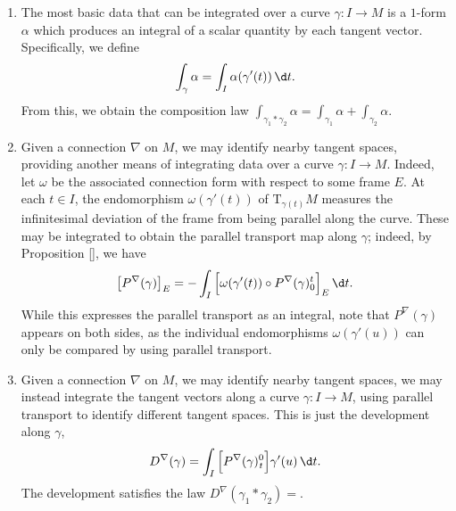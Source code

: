 \begin{enumerate}
  \item The most basic data that can be integrated over a curve $\gamma \colon I \to M$ is a $1$-form $\alpha$ which produces an integral of a scalar quantity by  each tangent vector. Specifically, we define
  \begin{equation}
    \int_{\gamma} \alpha = \int_{I} \alpha(\gamma'(t)) \, \d t.
  \end{equation}
  From this, we obtain the composition law $\int_{\gamma_1 \ast \gamma_2} \alpha = \int_{\gamma_1} \alpha + \int_{\gamma_2} \alpha$.

  \item Given a connection $\nabla$ on $M$, we may identify nearby tangent spaces, providing another means of integrating data over a curve $\gamma \colon I \to M $. Indeed, let $\omega$ be the associated connection form with respect to some frame $E$. At each $t \in I$, the endomorphism $\omega(\gamma'(t))$ of $\mathrm{T}_{\gamma(t)} M$ measures the infinitesimal deviation of the frame from being parallel along the curve. These may be integrated to obtain the parallel transport map along $\gamma$; indeed, by Proposition \ref{}, we have
  \begin{equation}
    \big[P^\nabla(\gamma)\big]_{E} = -\int_I \Big[\omega(\gamma'(t)) \circ P^\nabla(\gamma)_{0}^{t}\Big]_E \, \d t.
  \end{equation}
  While this expresses the parallel transport as an integral, note that $P^\nabla(\gamma)$ appears on both sides, as the individual endomorphisms $\omega(\gamma'(u))$ can only be compared by using parallel transport.

  \item Given a connection $\nabla$ on $M$, we may identify nearby tangent spaces, we may instead integrate the tangent vectors along a curve $\gamma \colon I \to M$, using parallel transport to identify different tangent spaces. This is just the development along $\gamma$, 
  \begin{equation}
    D^\nabla(\gamma) = \int_I \Big[ P^\nabla(\gamma)_{\mskip 1mu t}^{0} \Big]\gamma'(u) \, \d t.
  \end{equation}
  The development satisfies the  law $D^\nabla(\gamma_1 \ast \gamma_2) = $.
\end{enumerate}
